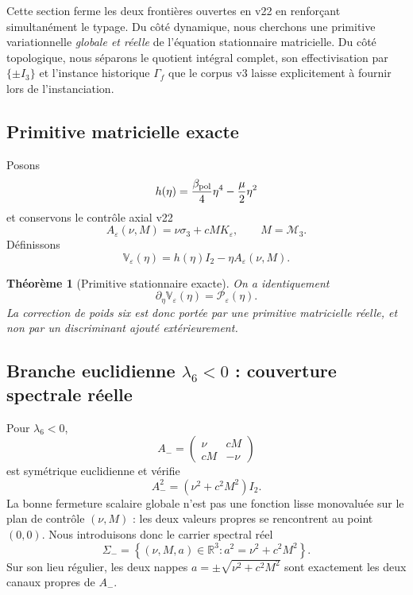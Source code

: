 \documentclass[11pt,a4paper]{article}
\newtheorem{theorem}{Théorème}[section]
\begin{document}
Cette section ferme les deux frontières ouvertes en v22 en renforçant simultanément le typage. Du côté dynamique, nous cherchons une primitive variationnelle \emph{globale et réelle} de l'équation stationnaire matricielle. Du côté topologique, nous séparons le quotient intégral complet, son effectivisation par $\{\pm I_3\}$ et l'instance historique $\Gamma_f$ que le corpus v3 laisse explicitement à fournir lors de l'instanciation.

\subsection{Primitive matricielle exacte}

Posons
\[
 h(\eta)=\frac{\beta_{\rm pol}}4\eta^4-\frac\mu2\eta^2
\]
et conservons le contrôle axial v22
\[
 A_\varepsilon(\nu,M)=\nu\sigma_3+cM K_\varepsilon,
 \qquad M=\mathcal M_3.
\]
Définissons
\begin{equation}\label{eq:v23-matrix-potential}
\boxed{
 \mathbb V_\varepsilon(\eta)
 =h(\eta)I_2-\eta A_\varepsilon(\nu,M).}
\end{equation}

\begin{theorem}[Primitive stationnaire exacte]\label{thm:v23-matrix-primitive}
On a identiquement
\[
 \boxed{\partial_\eta\mathbb V_\varepsilon(\eta)=\mathcal P_\varepsilon(\eta).}
\]
La correction de poids six est donc portée par une primitive matricielle réelle, et non par un discriminant ajouté extérieurement.
\end{theorem}

\subsection{Branche euclidienne \texorpdfstring{$\lambda_6<0$}{lambda6<0} : couverture spectrale réelle}

Pour $\lambda_6<0$,
\[
 A_-=
 \begin{pmatrix}
 \nu&cM\\
 cM&-\nu
 \end{pmatrix}
\]
est symétrique euclidienne et vérifie
\[
 A_-^2=(\nu^2+c^2M^2)I_2.
\]
La bonne fermeture scalaire globale n'est pas une fonction lisse monovaluée sur le plan de contrôle $(\nu,M)$ : les deux valeurs propres se rencontrent au point $(0,0)$. Nous introduisons donc le carrier spectral réel
\begin{equation}\label{eq:v23-spectral-cone-minus}
 \boxed{
 \Sigma_-=
 \left\{
 (\nu,M,a)\in\mathbb R^3:
 a^2=\nu^2+c^2M^2
 \right\}.}
\end{equation}
Sur son lieu régulier, les deux nappes $a=\pm\sqrt{\nu^2+c^2M^2}$ sont exactement les deux canaux propres de $A_-$.
\end{document}
